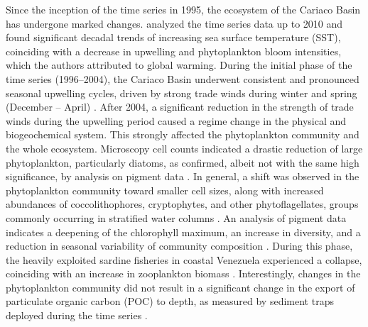 \documentclass[draft]{agujournal2019}
\begin{document}
    Since the inception of the time series in 1995, the ecosystem of the Cariaco Basin has undergone marked changes.  analyzed the time series data up to 2010 and found significant decadal trends of increasing sea surface temperature (SST), coinciding with a decrease in upwelling and phytoplankton bloom intensities, which the authors attributed to global warming. During the initial phase of the time series (1996–2004), the Cariaco Basin underwent consistent and pronounced seasonal upwelling cycles, driven by strong trade winds during winter and spring (December – April) \cite{mullerkarger_annual_2001, astor_seasonal_2003}. After 2004, a significant reduction in the strength of trade winds during the upwelling period \cite{taylor_ecosystem_2012} caused a regime change in the physical and biogeochemical system. This strongly affected the phytoplankton community and the whole ecosystem. Microscopy cell counts indicated a drastic reduction of large phytoplankton, particularly diatoms, as confirmed, albeit not with the same high significance, by analysis on pigment data  \cite{pinckney_phytoplankton_2015}. In general, a shift was observed in the phytoplankton community toward smaller cell sizes, along with increased abundances of coccolithophores, cryptophytes, and other phytoflagellates, groups commonly occurring in stratified water columns \cite{lorenzoni_characterization_2015}. An analysis of pigment data indicates a deepening of the chlorophyll maximum, an increase in diversity, and a reduction in seasonal variability of community composition \cite{pinckney_phytoplankton_2015}. During this phase, the heavily exploited sardine fisheries in coastal Venezuela experienced a collapse, coinciding with an increase in zooplankton biomass \cite{taylor_ecosystem_2012}. Interestingly, changes in the phytoplankton community did not result in a significant change in the export of particulate organic carbon (POC) to depth, as measured by sediment traps deployed during the time series \cite{pinckney_phytoplankton_2015}.
\end{document}

